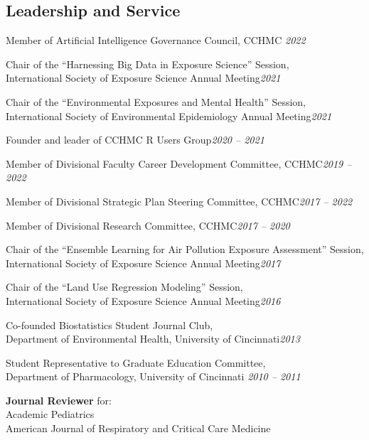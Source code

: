 \documentclass[margin,line]{res}
\newenvironment{list3}{
  \begin{list}{}{%
      \setlength{\itemsep}{0in}
      \setlength{\parsep}{0in} \setlength{\parskip}{0in}
      \setlength{\topsep}{0in} \setlength{\partopsep}{0in}
      \setlength{\leftmargin}{0in}}}{\end{list}}
\begin{document}
\begin{resume}
\section{\sc Leadership and Service}
\begin{list3} \itemsep 4pt
\item[] Member of Artificial Intelligence Governance Council, CCHMC \hfill \textit{2022}
\item[] Chair of the ``Harnessing Big Data in Exposure Science'' Session, \\International Society of Exposure Science Annual Meeting\hfill \textit{2021}
\item[] Chair of the ``Environmental Exposures and Mental Health'' Session, \\International Society of Environmental Epidemiology Annual Meeting\hfill \textit{2021}
\item[] Founder and leader of CCHMC R Users Group\hfill \textit{2020 -- 2021}
\item[] Member of Divisional Faculty Career Development Committee, CCHMC\hfill \textit{2019 -- 2022}
\item[] Member of Divisional Strategic Plan Steering Committee, CCHMC\hfill \textit{2017 -- 2022}
\item[] Member of Divisional Research Committee, CCHMC\hfill \textit{2017 -- 2020}
\item[] Chair of the ``Ensemble Learning for Air Pollution Exposure Assessment'' Session, \\International Society of Exposure Science Annual Meeting\hfill \textit{2017}
\item[] Chair of the ``Land Use Regression Modeling'' Session, \\International Society of Exposure Science Annual Meeting\hfill \textit{2016}
\item[] Co-founded Biostatistics Student Journal Club, \\Department of Environmental Health, University of Cincinnati\hfill \textit{2013}
\item[] Student Representative to Graduate Education Committee, \\Department of Pharmacology, University of Cincinnati \hfill \textit{2010 -- 2011}
\item[] \textbf{Journal Reviewer} for: \\
        Academic Pediatrics \\
        American Journal of Respiratory and Critical Care Medicine \\

\end{list3}
\end{resume}
\end{document}

